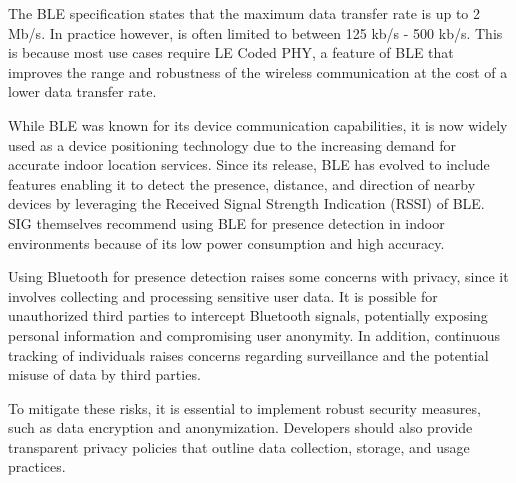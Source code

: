 The BLE specification states that the maximum data transfer rate is up to 2 Mb/s.
In practice however, is often limited to between 125 kb/s - 500 kb/s.
This is because most use cases require LE Coded PHY, a feature of BLE that improves the range and robustness of the wireless communication at the cost of a lower data transfer rate.

While BLE was known for its device communication capabilities, it is now widely used as a device positioning technology due to the increasing demand for accurate indoor location services.
Since its release, BLE has evolved to include features enabling it to detect the presence, distance, and direction of nearby devices by leveraging the Received Signal Strength Indication (RSSI) of BLE.
SIG themselves recommend using BLE for presence detection in indoor environments because of its low power consumption and high accuracy. \cite{BluetoothSIG}

Using Bluetooth for presence detection raises some concerns with privacy, since it involves collecting and processing sensitive user data.
It is possible for unauthorized third parties to intercept Bluetooth signals, potentially exposing personal information and compromising user anonymity.
In addition, continuous tracking of individuals raises concerns regarding surveillance and the potential misuse of data by third parties.

To mitigate these risks, it is essential to implement robust security measures, such as data encryption and anonymization.
Developers should also provide transparent privacy policies that outline data collection, storage, and usage practices.